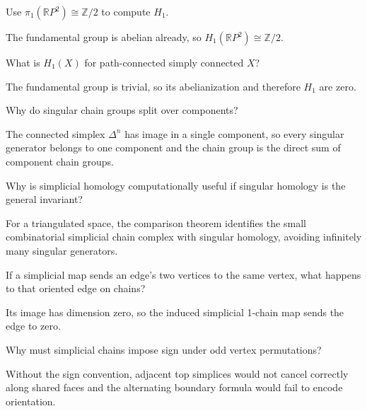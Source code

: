 \begin{problem}\label{prob:viii17-17}
Use \(\pi_1(\mathbb RP^2)\cong\mathbb Z/2\) to compute \(H_1\).
\end{problem}
\begin{solution}
The fundamental group is abelian already, so \(H_1(\mathbb RP^2)\cong\mathbb Z/2\).
\end{solution}

\begin{problem}\label{prob:viii17-18}
What is \(H_1(X)\) for path-connected simply connected \(X\)?
\end{problem}
\begin{solution}
The fundamental group is trivial, so its abelianization and therefore \(H_1\) are zero.
\end{solution}

\begin{problem}\label{prob:viii17-19}
Why do singular chain groups split over components?
\end{problem}
\begin{solution}
The connected simplex \(\Delta^n\) has image in a single component, so every singular generator belongs to one component and the chain group is the direct sum of component chain groups.
\end{solution}

\begin{problem}\label{prob:viii17-20}
Why is simplicial homology computationally useful if singular homology is the general invariant?
\end{problem}
\begin{solution}
For a triangulated space, the comparison theorem identifies the small combinatorial simplicial chain complex with singular homology, avoiding infinitely many singular generators.
\end{solution}

\begin{problem}\label{prob:viii17-21}
If a simplicial map sends an edge's two vertices to the same vertex, what happens to that oriented edge on chains?
\end{problem}
\begin{solution}
Its image has dimension zero, so the induced simplicial 1-chain map sends the edge to zero.
\end{solution}

\begin{problem}\label{prob:viii17-22}
Why must simplicial chains impose sign under odd vertex permutations?
\end{problem}
\begin{solution}
Without the sign convention, adjacent top simplices would not cancel correctly along shared faces and the alternating boundary formula would fail to encode orientation.
\end{solution}


